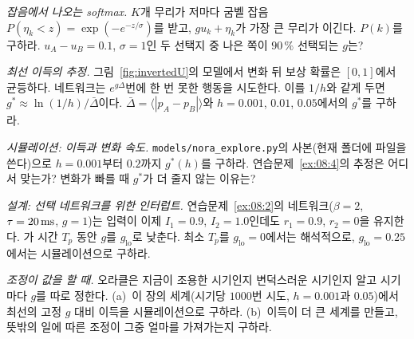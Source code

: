 \begin{exercise}[\lvlA]
\label{ex:08:3}
\emph{잡음에서 나오는 softmax.} $K$개 무리가 저마다 굼벨 잡음 $P(\eta_k<z)=\exp(-e^{-z/\sigma})$를 받고, $gu_k+\eta_k$가 가장 큰 무리가 이긴다. $P(k)$를 구하라. $u_A-u_B=0.1$, $\sigma=1$인 두 선택지 중 나은 쪽이 $90\,\%$ 선택되는 $g$는?
\end{exercise}

\begin{exercise}[\lvlB]
\label{ex:08:4}
\emph{최선 이득의 추정.} 그림~\ref{fig:invertedU}의 모델에서 변화 뒤 보상 확률은 $[0,1]$에서 균등하다. 네트워크는 $e^{g\Delta}$번에 한 번 못한 행동을 시도한다. 이를 $1/h$와 같게 두면 $g^*\approx\ln(1/h)/\bar\Delta$이다. $\bar\Delta=\langle|p_A-p_B|\rangle$와 $h=0.001$, $0.01$, $0.05$에서의 $g^*$를 구하라.
\end{exercise}

\begin{exercise}[\lvlB]
\label{ex:08:5}
\emph{시뮬레이션: 이득과 변화 속도.} \texttt{models/\allowbreak nora\_explore.py}의 사본(현재 폴더에 파일을 쓴다)으로 $h=0.001$부터 $0.2$까지 $g^*(h)$를 구하라. 연습문제~\ref{ex:08:4}의 추정은 어디서 맞는가? 변화가 빠를 때 $g^*$가 더 줄지 않는 이유는?
\end{exercise}

\begin{exercise}[\lvlB]
\label{ex:08:6}
\emph{설계: 선택 네트워크를 위한 인터럽트.} 연습문제~\ref{ex:08:2}의 네트워크($\beta=2$, $\tau=20\,\text{ms}$, $g=1$)는 입력이 이제 $I_1=0.9$, $I_2=1.0$인데도 $r_1=0.9$, $r_2=0$을 유지한다. 가 시간 $T_p$ 동안 $g$를 $g_{\text{lo}}$로 낮춘다. 최소 $T_p$를 $g_{\text{lo}}=0$에서는 해석적으로, $g_{\text{lo}}=0.25$에서는 시뮬레이션으로 구하라.
\end{exercise}

\begin{exercise}[\lvlC]
\label{ex:08:7}
\emph{조정이 값을 할 때.} 오라클은 지금이 조용한 시기인지 변덕스러운 시기인지 알고 시기마다 $g$를 따로 정한다. (a)~이 장의 세계(시기당 $1000$번 시도, $h=0.001$과 $0.05$)에서 최선의 고정 $g$ 대비 이득을 시뮬레이션으로 구하라. (b)~이득이 더 큰 세계를 만들고, 뜻밖의 일에 따른 조정이 그중 얼마를 가져가는지 구하라.
\end{exercise}
